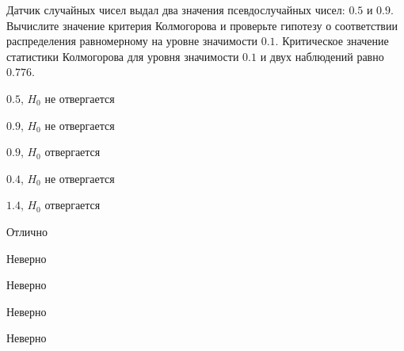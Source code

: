 
\begin{question}
Датчик случайных чисел выдал два значения псевдослучайных чисел: \(0.5\)
и \(0.9\). Вычислите значение критерия Колмогорова и проверьте гипотезу
о соответствии распределения равномерному на уровне значимости \(0.1\).
Критическое значение статистики Колмогорова для уровня значимости
\(0.1\) и двух наблюдений равно \(0.776\).
\begin{answerlist}
  \item \(0.5\), \(H_0\) не отвергается
  \item \(0.9\), \(H_0\) не отвергается
  \item \(0.9\), \(H_0\) отвергается
  \item \(0.4\), \(H_0\) не отвергается
  \item \(1.4\), \(H_0\) отвергается
\end{answerlist}
\end{question}

\begin{solution}
\begin{answerlist}
  \item Отлично
  \item Неверно
  \item Неверно
  \item Неверно
  \item Неверно
\end{answerlist}
\end{solution}

